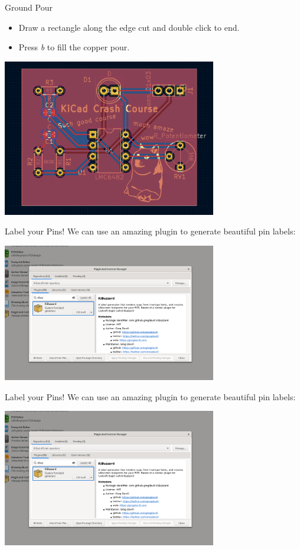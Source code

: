 \documentclass{beamer}
\begin{document}
\begin{frame}{Ground Pour}
  \begin{itemize}
    \item Draw a rectangle along the edge cut and double click to end.
    \item Press \textit{b} to fill the copper pour.
  \end{itemize}

  \begin{center}
    \includegraphics[width=0.7\textwidth]{images/zones-filled.png}
  \end{center}
\end{frame}

\begin{frame}{Label your Pins!}
  We can use an amazing plugin to generate beautiful pin labels:
  \begin{center}
    \includegraphics[width=0.7\textwidth]{images/kibuzzard.png}
  \end{center}
\end{frame}

\begin{frame}{Label your Pins!}
  We can use an amazing plugin to generate beautiful pin labels:
  \begin{center}
    \includegraphics[width=0.7\textwidth]{images/kibuzzard.png}
  \end{center}
\end{frame}
\end{document}
